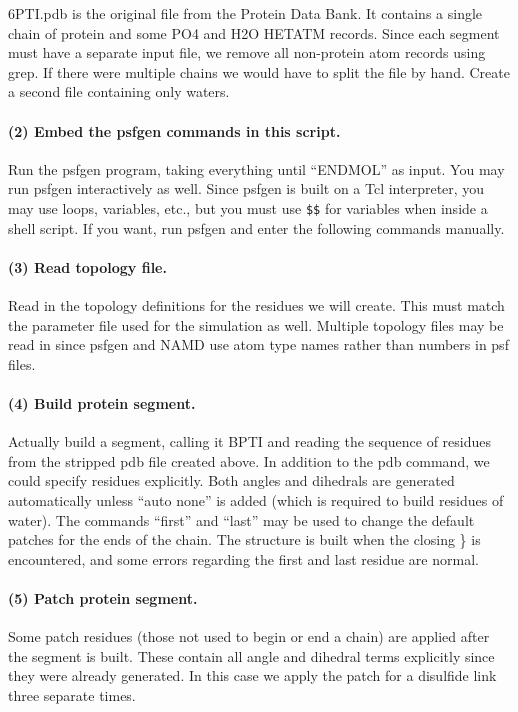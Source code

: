 6PTI.pdb is the original file from the Protein Data Bank.  It contains
a single chain of protein and some PO4 and H2O HETATM records.  Since
each segment must have a separate input file, we remove all non-protein
atom records using grep.  If there were multiple chains we would have
to split the file by hand.  Create a second file containing only waters.

\paragraph*{(2) Embed the psfgen commands in this script.}
Run the psfgen program, taking everything until ``ENDMOL'' as input.
You may run psfgen interactively as well.  Since psfgen is built on
a Tcl interpreter, you may use loops, variables, etc., but you must
use \verb#$$# for variables when inside a shell script.  If you
want, run psfgen and enter the following commands manually.

\paragraph*{(3) Read topology file.}
Read in the topology definitions for the residues we will create.
This must match the parameter file used for the simulation as well.
Multiple topology files may be read in since psfgen and NAMD use atom
type names rather than numbers in psf files.

\paragraph*{(4) Build protein segment.}
Actually build a segment, calling it BPTI and reading the sequence
of residues from the stripped pdb file created above.  In addition to
the pdb command, we could specify residues explicitly.  Both angles
and dihedrals are generated automatically unless ``auto none'' is added
(which is required to build residues of water).  The commands ``first''
and ``last'' may be used to change the default patches for the ends of
the chain.  The structure is built when the closing \} is encountered,
and some errors regarding the first and last residue are normal.

\paragraph*{(5) Patch protein segment.}
Some patch residues (those not used to begin or end a chain) are
applied after the segment is built.  These contain all angle and
dihedral terms explicitly since they were already generated.  In this
case we apply the patch for a disulfide link three separate times.

